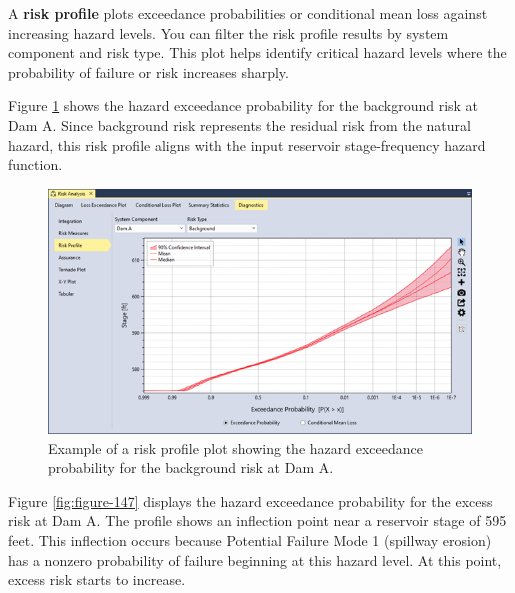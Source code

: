 \documentclass[
]{book}
\begin{document}
A \textbf{risk profile} plots exceedance probabilities or conditional mean loss against increasing hazard levels. You can filter the risk profile results by system component and risk type. This plot helps identify critical hazard levels where the probability of failure or risk increases sharply.

Figure \ref{fig:figure-146} shows the hazard exceedance probability for the background risk at Dam A. Since background risk represents the residual risk from the natural hazard, this risk profile aligns with the input reservoir stage-frequency hazard function.

\begin{figure}

{\centering \includegraphics{images/figure146} 

}

\caption{Example of a risk profile plot showing the hazard exceedance probability for the background risk at Dam A.}\label{fig:figure-146}
\end{figure}

Figure \ref{fig:figure-147} displays the hazard exceedance probability for the excess risk at Dam A. The profile shows an inflection point near a reservoir stage of 595 feet. This inflection occurs because Potential Failure Mode 1 (spillway erosion) has a nonzero probability of failure beginning at this hazard level. At this point, excess risk starts to increase.
\end{document}
